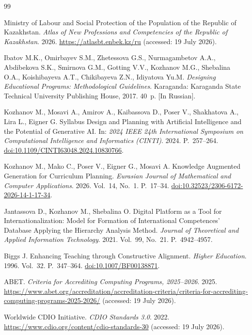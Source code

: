 \documentclass[twoside,11pt]{article}
\begin{document}
\begin{thebibliography}{99}
\small

Ministry of Labour and Social Protection of the Population of the Republic of Kazakhstan.
\textit{Atlas of New Professions and Competencies of the Republic of Kazakhstan}. 2026.
\url{https://atlasbt.enbek.kz/ru} (accessed: 19 July 2026).

Ibatov M.K., Omirbayev S.M., Zhetessova G.S., Nurmagambetov A.A., Abdibekova S.K., Smirnova G.M., Gotting V.V., Kozhanov M.G., Shebalina O.A., Koishibayeva A.T., Chikibayeva Z.N., Idiyatova Yu.M.
\textit{Designing Educational Programs: Methodological Guidelines}.
Karaganda: Karaganda State Technical University Publishing House, 2017. 40~p. [In Russian].

Kozhanov M., Mosavi A., Amirov A., Kaibassova D., Poser V., Shakhatova A., Lira L., Eigner G.
Syllabus Design and Planning with Artificial Intelligence and the Potential of Generative AI.
In: \textit{2024 IEEE 24th International Symposium on Computational Intelligence and Informatics (CINTI)}. 2024. P.~257--264.
\href{https://doi.org/10.1109/CINTI63048.2024.10830766}{doi:10.1109/CINTI63048.2024.10830766}.

Kozhanov M., Mako C., Poser V., Eigner G., Mosavi A.
Knowledge Augmented Generation for Curriculum Planning.
\textit{Eurasian Journal of Mathematical and Computer Applications}. 2026. Vol.~14, No.~1. P.~17--34.
\href{https://doi.org/10.32523/2306-6172-2026-14-1-17-34}{doi:10.32523/2306-6172-2026-14-1-17-34}.

Jantassova D., Kozhanov M., Shebalina O.
Digital Platform as a Tool for Internationalization: Model for Formation of International Competences' Database Applying the Hierarchy Analysis Method.
\textit{Journal of Theoretical and Applied Information Technology}. 2021. Vol.~99, No.~21. P.~4942--4957.

Biggs J.
Enhancing Teaching through Constructive Alignment.
\textit{Higher Education}. 1996. Vol.~32. P.~347--364.
\href{https://doi.org/10.1007/BF00138871}{doi:10.1007/BF00138871}.

ABET.
\textit{Criteria for Accrediting Computing Programs, 2025--2026}. 2025.
\url{https://www.abet.org/accreditation/accreditation-criteria/criteria-for-accrediting-computing-programs-2025-2026/} (accessed: 19 July 2026).

Worldwide CDIO Initiative.
\textit{CDIO Standards 3.0}. 2022.
\url{https://www.cdio.org/content/cdio-standards-30} (accessed: 19 July 2026).


\end{thebibliography}
\end{document}
